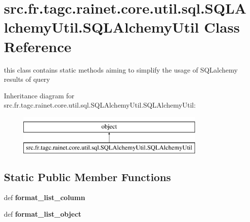 \hypertarget{classsrc_1_1fr_1_1tagc_1_1rainet_1_1core_1_1util_1_1sql_1_1SQLAlchemyUtil_1_1SQLAlchemyUtil}{\section{src.\-fr.\-tagc.\-rainet.\-core.\-util.\-sql.\-S\-Q\-L\-Alchemy\-Util.\-S\-Q\-L\-Alchemy\-Util Class Reference}
\label{classsrc_1_1fr_1_1tagc_1_1rainet_1_1core_1_1util_1_1sql_1_1SQLAlchemyUtil_1_1SQLAlchemyUtil}
}


this class contains static methods aiming to simplify the usage of S\-Q\-Lalchemy results of query  


Inheritance diagram for src.\-fr.\-tagc.\-rainet.\-core.\-util.\-sql.\-S\-Q\-L\-Alchemy\-Util.\-S\-Q\-L\-Alchemy\-Util\-:\begin{figure}[H]
\begin{center}
\leavevmode
\includegraphics[height=2.000000cm]{classsrc_1_1fr_1_1tagc_1_1rainet_1_1core_1_1util_1_1sql_1_1SQLAlchemyUtil_1_1SQLAlchemyUtil}
\end{center}
\end{figure}
\subsection*{Static Public Member Functions}
\begin{DoxyCompactItemize}
\item 
\hypertarget{classsrc_1_1fr_1_1tagc_1_1rainet_1_1core_1_1util_1_1sql_1_1SQLAlchemyUtil_1_1SQLAlchemyUtil_af97f3bd048b3d3e0d5c964d47e4eaf24}{def {\bfseries format\-\_\-list\-\_\-column}}\label{classsrc_1_1fr_1_1tagc_1_1rainet_1_1core_1_1util_1_1sql_1_1SQLAlchemyUtil_1_1SQLAlchemyUtil_af97f3bd048b3d3e0d5c964d47e4eaf24}

\item 
\hypertarget{classsrc_1_1fr_1_1tagc_1_1rainet_1_1core_1_1util_1_1sql_1_1SQLAlchemyUtil_1_1SQLAlchemyUtil_adf07939aa587c04a1d243256cd918272}{def {\bfseries format\-\_\-list\-\_\-object}}\label{classsrc_1_1fr_1_1tagc_1_1rainet_1_1core_1_1util_1_1sql_1_1SQLAlchemyUtil_1_1SQLAlchemyUtil_adf07939aa587c04a1d243256cd918272}

\end{DoxyCompactItemize}


